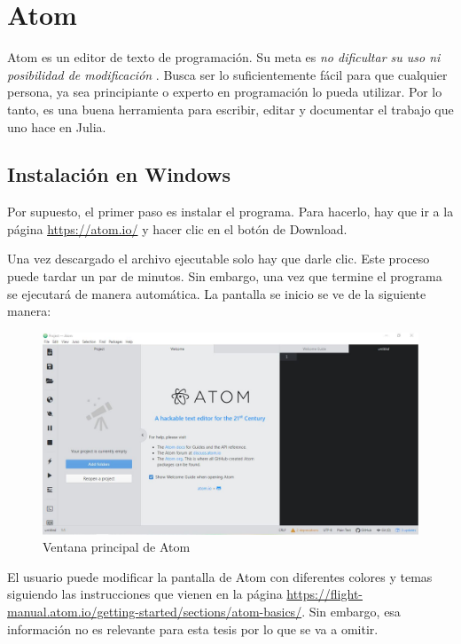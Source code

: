 \section{Atom}
Atom es un editor de texto de programación. Su meta es \textit{no dificultar su uso ni posibilidad de modificación} \citep{ATOM}.  Busca ser lo suficientemente fácil para que cualquier persona, ya sea principiante o experto en programación lo pueda utilizar. Por lo tanto, es una buena herramienta para escribir, editar y documentar el trabajo que uno hace en Julia. 

\subsection{Instalación en Windows} 
Por supuesto, el primer paso es instalar el programa. Para hacerlo, hay que ir a la página \url{https://atom.io/} y hacer clic en el botón de \textsf{Download}. 

Una vez descargado el archivo ejecutable solo hay que darle clic. Este proceso puede tardar un par de minutos. Sin embargo, una vez que termine el programa se ejecutará de manera automática. La pantalla se inicio se ve de la siguiente manera:

\begin{figure}[h]
\begin{center}
\includegraphics[scale=0.45]{Imagenes/atom_main_window.JPG}
 \caption{Ventana principal de Atom}
  \label{main_atom}
\end{center}
\end{figure}

El usuario puede modificar la pantalla de Atom con diferentes colores y temas siguiendo las instrucciones que vienen en la página \url{https://flight-manual.atom.io/getting-started/sections/atom-basics/}. Sin embargo, esa información no es relevante para esta tesis por lo que se va a omitir. 


